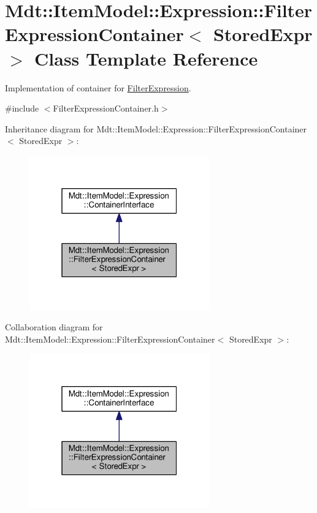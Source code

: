 \hypertarget{class_mdt_1_1_item_model_1_1_expression_1_1_filter_expression_container}{}\section{Mdt\+:\+:Item\+Model\+:\+:Expression\+:\+:Filter\+Expression\+Container$<$ Stored\+Expr $>$ Class Template Reference}
\label{class_mdt_1_1_item_model_1_1_expression_1_1_filter_expression_container}


Implementation of container for \hyperlink{class_mdt_1_1_item_model_1_1_filter_expression}{Filter\+Expression}.  




{\ttfamily \#include $<$Filter\+Expression\+Container.\+h$>$}



Inheritance diagram for Mdt\+:\+:Item\+Model\+:\+:Expression\+:\+:Filter\+Expression\+Container$<$ Stored\+Expr $>$\+:
\nopagebreak
\begin{figure}[H]
\begin{center}
\leavevmode
\includegraphics[width=220pt]{class_mdt_1_1_item_model_1_1_expression_1_1_filter_expression_container__inherit__graph}
\end{center}
\end{figure}


Collaboration diagram for Mdt\+:\+:Item\+Model\+:\+:Expression\+:\+:Filter\+Expression\+Container$<$ Stored\+Expr $>$\+:
\nopagebreak
\begin{figure}[H]
\begin{center}
\leavevmode
\includegraphics[width=220pt]{class_mdt_1_1_item_model_1_1_expression_1_1_filter_expression_container__coll__graph}
\end{center}
\end{figure}
